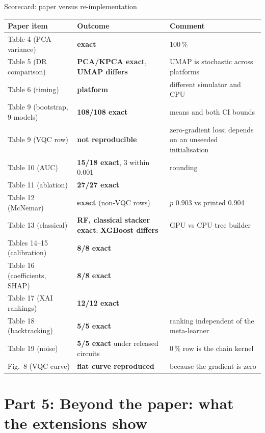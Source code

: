 \documentclass[aspectratio=169,10pt,t,xcolor={table}]{beamer}
\newcommand{\ok}[1]{\textcolor{qgreen}{\textbf{#1}}}
\newcommand{\bad}[1]{\textcolor{qred}{\textbf{#1}}}
\newcommand{\warn}[1]{\textcolor{qamber}{\textbf{#1}}}
\begin{document}
\begin{frame}{Scorecard: paper versus re-implementation}
\scriptsize
\begin{tabular}{llp{5.6cm}}
\toprule
Paper item & Outcome & Comment \\
\midrule
Table 4 (PCA variance) & \ok{exact} & 100\,\% \\
Table 5 (DR comparison) & \ok{PCA/KPCA exact}, \warn{UMAP differs} & UMAP is stochastic across platforms \\
Table 6 (timing) & \warn{platform} & different simulator and CPU \\
Table 9 (bootstrap, 9 models) & \ok{108/108 exact} & means and both CI bounds \\
Table 9 (VQC row) & \bad{not reproducible} & zero-gradient loss; depends on an unseeded initialisation \\
Table 10 (AUC) & \ok{15/18 exact}, 3 within 0.001 & rounding \\
Table 11 (ablation) & \ok{27/27 exact} & \\
Table 12 (McNemar) & \ok{exact} (non-VQC rows) & $p$ 0.903 vs printed 0.904 \\
Table 13 (classical) & \ok{RF, classical stacker exact}; \warn{XGBoost differs} & GPU vs CPU tree builder \\
Tables 14--15 (calibration) & \ok{8/8 exact} & \\
Table 16 (coefficients, SHAP) & \ok{8/8 exact} & \\
Table 17 (XAI rankings) & \ok{12/12 exact} & \\
Table 18 (backtracking) & \ok{5/5 exact} & ranking independent of the meta-learner \\
Table 19 (noise) & \ok{5/5 exact} under released circuits & 0\,\% row is the chain kernel \\
Fig.~8 (VQC curve) & \ok{flat curve reproduced} & because the gradient is zero \\
\bottomrule
\end{tabular}
\end{frame}

\section{Part 5: Beyond the paper: what the extensions show}
\end{document}
